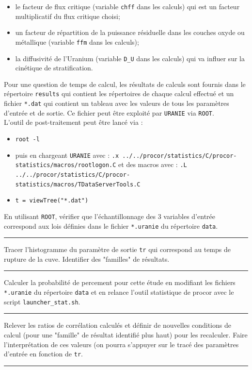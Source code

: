 \documentclass[3p]{elsarticle}
\newenvironment{remark}[1][\textit{Nota Bene}]{\begin{trivlist}
\item[\hskip \labelsep {\bfseries \rule{1ex}{1ex} #1}]\ignorespaces}{\rule{1ex}{1ex} \end{trivlist}\ignorespacesafterend}
\newcounter{question}
\newcommand{\Q}[1]{\stepcounter{question}\begin{remark}[Q\arabic{question}]#1~~\end{remark}}
\begin{document}
\begin{itemize}
	\item le facteur de flux critique (variable \texttt{chff} dans les calculs) qui est un facteur multiplicatif du flux critique choisi; 
	\item un facteur de répartition de la puissance résiduelle dans les couches oxyde ou métallique (variable \texttt{ffm} dans les calculs); 
	\item la diffusivité de l'Uranium (variable \texttt{D\_U} dans les calculs) qui va influer sur la cinétique de stratification.
\end{itemize}

Pour une question de temps de calcul, les résultats de calculs sont fournis dans le répertoire \texttt{results} qui contient les répertoires de chaque calcul effectué et un fichier \texttt{*.dat} qui contient un tableau avec les valeurs de tous les paramètres d'entrée et de sortie. Ce fichier peut être exploité par \texttt{URANIE} via \texttt{ROOT}.\\

L'outil de post-traitement peut être lancé via :
\begin{itemize}
    \item \texttt{root -l}
    \item puis en chargeant \texttt{URANIE} avec : \texttt{.x ../../procor/statistics/C/procor-statistics/macros/rootlogon.C} et des macros avec : \texttt{.L ../../procor/statistics/C/procor-statistics/macros/TDataServerTools.C}
    \item \texttt{t = viewTree("*.dat")}
\end{itemize}


\Q{En utilisant \texttt{ROOT}, vérifier que l'échantillonnage des 3 variables d'entrée correspond aux lois définies dans le fichier \texttt{*.uranie} du répertoire \texttt{data}.}

\Q{Tracer l'histogramme du paramètre de sortie \texttt{tr} qui correspond au temps de rupture de la cuve. Identifier des "familles" de résultats.}

\Q{Calculer la probabilité de percement pour cette étude en modifiant les fichiers \texttt{*.uranie} du répertoire \texttt{data} et en relance l'outil statistique de procor avec le script \texttt{launcher\_stat.sh}.}

\Q{Relever les ratios de corrélation calculés et définir de nouvelles conditions de calcul (pour une "famille" de résultat identifié plus haut) pour les recalculer. Faire l'interprétation de ces valeurs (on pourra s'appuyer sur le tracé des paramètres d'entrée en fonction de \texttt{tr}.}
\end{document}
